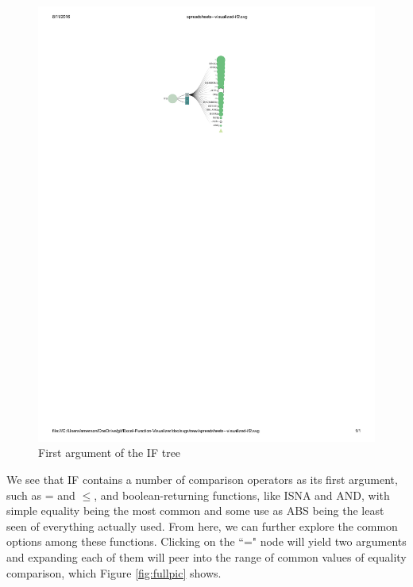 \documentclass[conference]{IEEEtran}
\begin{document}
	\begin{figure}[h] \centering \includegraphics[scale=.4]{IFexpand}
		\caption{First argument of the IF tree} \label{fig:expandif} \end{figure}
	
	We see that IF contains a number of comparison operators as its first argument,
	such as = and $\le$, and boolean-returning functions, like ISNA and AND, with
	simple equality being the most common and some use as ABS being the least seen
	of everything actually used. From here, we can further explore the common options among these functions.
	Clicking on the ``=" node will yield two arguments and expanding each of them
	will peer into the range of common values of equality comparison, which Figure
	\ref{fig:fullpic} shows. \par
	
\end{document}
